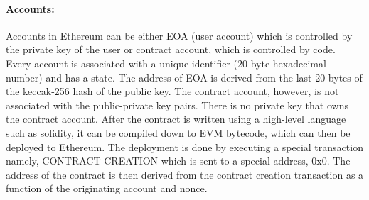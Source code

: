 \paragraph{Accounts:}Accounts in Ethereum can be either \ac{EOA} (user account)
which is controlled by the private key of the user or contract account, which
is controlled by code. Every account is associated with a unique identifier
(20-byte hexadecimal number) and has a state. The address of \ac{EOA} is
derived from the last 20 bytes of the keccak-256 hash of the public key. The
contract account, however, is not associated with the public-private key pairs.
There is no private key that owns the contract account. After the contract is
written using a high-level language such as solidity, it can be compiled down
to EVM bytecode, which can then be deployed to Ethereum. The deployment is done
by executing a special transaction namely, CONTRACT CREATION which is sent to a
special address, 0x0. The address of the contract is then derived from the
contract creation transaction as a function of the originating account and
nonce. 
